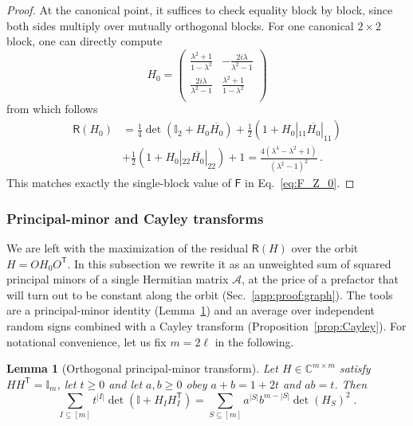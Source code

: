 \documentclass[prx,twocolumn,superscriptaddress,aps,10pt, frontmatterverbose, reprint,footinbib,longbibliography=true]{revtex4-2}
\newtheorem{lemma}{Lemma}
\newcommand{\trans}{\mathsf{T}}
\begin{document}
\begin{proof}
At the canonical point, it suffices to check equality block by block, since both sides multiply over mutually orthogonal blocks. For one canonical $2\times2$ block, one can directly compute
\begin{equation}
    H_0= \left(
\begin{array}{cc}
 \frac{\lambda ^2+1}{1-\lambda ^2} & -\frac{2 i \lambda }{\lambda ^2-1} \\
 \frac{2 i \lambda }{\lambda ^2-1} & \frac{\lambda ^2+1}{1-\lambda ^2} \\
\end{array}
\right)
\end{equation}
from which follows
\begin{equation}
\begin{split}
    \mathsf{R}(H_0)&= \frac{1}{4} \det(\mathbb{I}_2+ H_0\overline{H_0}) + \frac{1}{2} (1+ H_0|_{11} \overline{H_0} |_{11} ) \\
    &+ \frac{1}{2} (1+ H_0|_{22} \overline{H_0} |_{22} ) + 1= \frac{4 \left(\lambda ^4-\lambda ^2+1\right)}{\left(\lambda ^2-1\right)^2}\,.
\end{split}
\end{equation}
This matches exactly the single-block value of $\mathsf{F}$ in Eq.~\eqref{eq:F_Z_0}.
\end{proof}
\subsubsection{Principal-minor and Cayley transforms}
\label{app:proof:cayley}

We are left with the maximization of the residual $\mathsf{R}(H)$ over the orbit $H=OH_0O^{\trans}$. In this subsection we rewrite it as an unweighted sum of squared principal minors of a single Hermitian matrix $\mathcal{A}$, at the price of a prefactor that will turn out to be constant along the orbit (Sec.~\ref{app:proof:graph}). The tools are a principal-minor identity (Lemma~\ref{lem:PMT}) and an average over independent random signs combined with a Cayley transform (Proposition~\ref{prop:Cayley}).
For notational convenience, let us fix $m=2\ell$ in the following. 
\begin{lemma}[Orthogonal principal-minor transform]
\label{lem:PMT}
Let $H\in\mathbb{C}^{m\times m}$ satisfy $HH^{\trans}=\mathbb{I}_m$, let $t\ge0$ and let $a,b\ge0$ obey $a+b=1+2t$ and $ab=t$. Then
\begin{equation}
    \sum_{I\subseteq[m]}t^{|I|}\det\!\left(\mathbb{I}+H_IH_I^{\trans}\right)=\sum_{S\subseteq[m]}a^{|S|}b^{m-|S|}\det(H_S)^2\;.
    \label{eq:PMT}
\end{equation}
\end{lemma}
\end{document}

